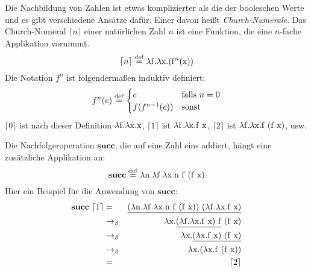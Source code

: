 Die Nachbildung von Zahlen ist etwas komplizierter als die der
booleschen Werte und es gibt verschiedene Ansätze dafür.  Einer davon heißt
\textit{Church-Numerale}.  Das
Church-Numeral $\lceil n\rceil$ einer natürlichen Zahl
$n$ ist eine Funktion, die eine $n$-fache Applikation vornimmt.
%
\begin{displaymath}
  \lceil n\rceil \stackrel{\rm def}{=}{} \lambda \mathrm f.\lambda \mathrm x.(\mathrm{f}^n(\mathrm x))
\end{displaymath}
Die Notation $f^n$ ist folgendermaßen induktiv definiert:
%
\begin{displaymath}
  f^n(e) \stackrel{\rm def}{=}
  \begin{cases}
    e & \text{falls } n = 0\\
    f(f^{n-1}(e)) & \text{sonst}
  \end{cases}
\end{displaymath}
%
$\lceil 0\rceil$ ist nach dieser Definition
$\lambda \mathrm f.\lambda \mathrm x.\mathrm x$, $\lceil 1\rceil$ ist $\lambda
\mathrm f.\lambda \mathrm x.\mathrm f~\mathrm x$,
$\lceil 2\rceil$ ist $\lambda \mathrm f.\lambda \mathrm x.\mathrm f~(\mathrm f~\mathrm x)$, usw.

Die Nachfolgeroperation $\mathbf{succ}$, die auf
eine Zahl eins addiert, hängt eine zusätzliche Applikation an:
%
\begin{displaymath}
  \mathbf{succ} \stackrel{\rm def}{=}{} \lambda \mathrm n.\lambda \mathrm f.\lambda \mathrm x.\mathrm n~\mathrm f~(\mathrm f~\mathrm x)
\end{displaymath}
%
Hier ein Beispiel für die Anwendung von $\mathbf{succ}$:
%
\begin{eqnarray*}
  \mathbf{succ}~\lceil 1\rceil & = &
\underline{(\lambda \mathrm n.\lambda \mathrm f.\lambda \mathrm x.\mathrm n~\mathrm f~(\mathrm f~\mathrm x))~(\lambda \mathrm f.\lambda \mathrm x.\mathrm f~\mathrm x)}\\
                               &\rightarrow_\beta&
                                                   \lambda \mathrm x.\underline{(\lambda \mathrm f.\lambda \mathrm x.\mathrm f~\mathrm x)~\mathrm f}~(\mathrm f~\mathrm x)
  \\
                               &\rightarrow_\beta&
                                                   \lambda \mathrm x.\underline{(\lambda \mathrm x.\mathrm f~\mathrm x)~(\mathrm f~\mathrm x)}
\\
                               &\rightarrow_\beta&
                                                   \lambda \mathrm x.(\lambda \mathrm x.\mathrm f~\mathrm (\mathrm f~\mathrm x))
  \\
  &=& \lceil 2\rceil
\end{eqnarray*}

